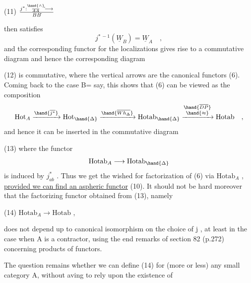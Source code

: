 
(11) \qquad $j^{*} : \overset{\hand{\wedge}}{\over{A}{A}}\hat{}\longrightarrow \over{B}{B}\hat{}$

then satisfies
\[ j^{*\,-1}(\underline{W}_B) = \underline{W}_A \quad , \]
and the corresponding functor for the localizations gives rise to a
commutative diagram
and hence the corresponding diagram

(12)
is commutative, where the vertical arrows are the canonical functors
(6). Coming back to the case B=\hand{$\Delta$} say, this shows that (6) can be
viewed as the composition
\[ \mathrm{Hot}_A \xrightarrow{\hand{\overline{j^*}}} \mathrm{Hot}_{\hand{\Delta}} \xrightarrow{\hand{\overline{Wh_{\Delta}}}} \mathrm{Hotab}_{\hand{\Delta}} \xrightarrow{\substack{\hand{\overline{DP}}\\ \hand{\approx}}} \mathrm{Hotab} \quad , \]
and hence it can be inserted in the commutative diagram

(13)
where the functor
\[ \mathrm{Hotab}_A \longrightarrow \mathrm{Hotab}_{\hand{\Delta}} \]
is induced by $j^{*}_{ab}$ . Thus we get the wished for factorization of (6)
via $\mathrm{Hotab}_A$ , \uline{provided we can find an aspheric functor} (10). It
should not be hard moreover  that the factorizing functor obtained
from (13), namely

(14) \qquad $\mathrm{Hotab}_A \longrightarrow \mathrm{Hotab}$ \quad ,

does not depend up to canonical isomorphism on the choice of j , at
least in the case when A is a contractor, using the end remarks of
section 82 (p.272) concerning products of  functors.

The question remains whether we can define (14) for (more or less)
any small category A, without aving to rely upon the  existence of

